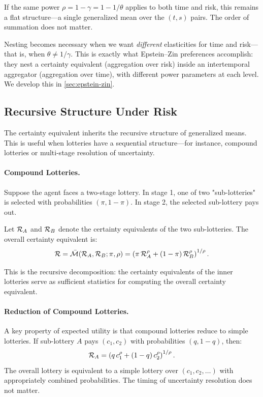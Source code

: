 If the same power $\rho = 1 - \gamma = 1 - 1/\theta$ applies to both time and risk, this remains a flat structure---a single generalized mean over the $(t,s)$ pairs. The order of summation does not matter.

\begin{calloutnote}
Nesting becomes necessary when we want \emph{different} elasticities for time and risk---that is, when $\theta \neq 1/\gamma$. This is exactly what Epstein--Zin preferences accomplish: they nest a certainty equivalent (aggregation over risk) inside an intertemporal aggregator (aggregation over time), with different power parameters at each level. We develop this in \cref{sec:epstein-zin}.
\end{calloutnote}

\subsection{Recursive Structure Under Risk}
\label{subsec:recursive-risk}

The certainty equivalent inherits the recursive structure of generalized means. This is useful when lotteries have a sequential structure---for instance, compound lotteries or multi-stage resolution of uncertainty.

\paragraph{Compound Lotteries.}
Suppose the agent faces a two-stage lottery. In stage 1, one of two "sub-lotteries" is selected with probabilities $(\pi, 1-\pi)$. In stage 2, the selected sub-lottery pays out.

Let $\mathcal{R}_A$ and $\mathcal{R}_B$ denote the certainty equivalents of the two sub-lotteries. The overall certainty equivalent is:
\begin{equation}
\mathcal{R} = \bar{\mathcal{M}}(\mathcal{R}_A, \mathcal{R}_B; \pi, \rho) = \left( \pi \, \mathcal{R}_A^{\rho} + (1-\pi) \, \mathcal{R}_B^{\rho} \right)^{1/\rho}.
\label{eq:compound-lottery}
\end{equation}

This is the recursive decomposition: the certainty equivalents of the inner lotteries serve as sufficient statistics for computing the overall certainty equivalent.

\paragraph{Reduction of Compound Lotteries.}
A key property of expected utility is that compound lotteries reduce to simple lotteries. If sub-lottery $A$ pays $(c_1, c_2)$ with probabilities $(q, 1-q)$, then:
\begin{equation}
\mathcal{R}_A = \left( q \, c_1^{\rho} + (1-q) \, c_2^{\rho} \right)^{1/\rho}.
\label{eq:sub-lottery-a}
\end{equation}
The overall lottery is equivalent to a simple lottery over $(c_1, c_2, \ldots)$ with appropriately combined probabilities. The timing of uncertainty resolution does not matter.

